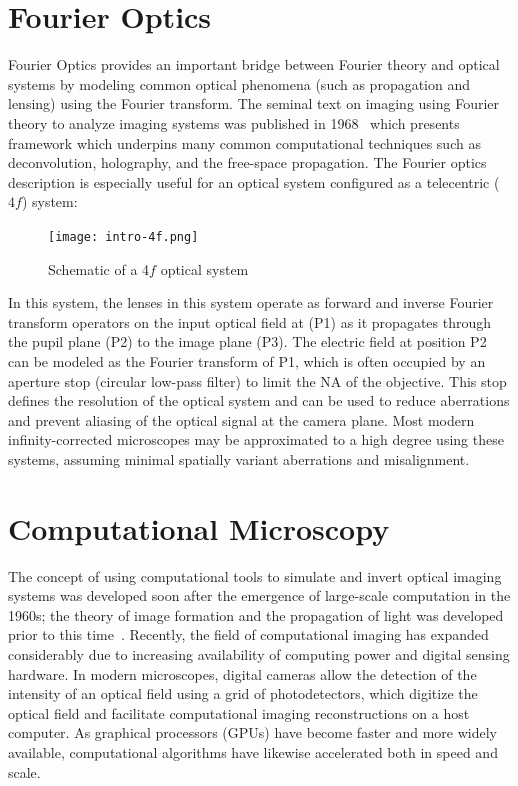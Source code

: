 \section{Fourier Optics}
Fourier Optics provides an important bridge between Fourier theory and optical systems by modeling common optical phenomena (such as propagation and lensing) using the Fourier transform. The seminal text on imaging using Fourier theory to analyze imaging systems was published in 1968~\cite{goodman:68} which presents framework which underpins many common computational techniques such as deconvolution, holography, and the free-space propagation. The Fourier optics description is especially useful for an optical system configured as a telecentric ($4f$) system:

\begin{figure}[tbh]
\centering
\texttt{[image: intro-4f.png]}
\caption{\label{fig:4f} Schematic of a 4$f$ optical system}
\end{figure}

\noindent In this system, the lenses in this system operate as forward and inverse Fourier transform operators on the input optical field at (P1) as it propagates through the pupil plane (P2) to the image plane (P3). The electric field at position P2 can be modeled as the Fourier transform of P1, which is often occupied by an aperture stop (circular low-pass filter) to limit the NA of the objective. This stop defines the resolution of the optical system and can be used to reduce aberrations and prevent aliasing of the optical signal at the camera plane. Most modern infinity-corrected microscopes may be approximated to a high degree using these systems, assuming minimal spatially variant aberrations and misalignment.

\section{Computational Microscopy}

The concept of using computational tools to simulate and invert optical imaging systems was developed soon after the emergence of large-scale computation in the 1960s; the theory of image formation and the propagation of light was developed prior to this time~\cite{maxwell1890scientific, gernheim1969history}. Recently, the field of computational imaging has expanded considerably due to increasing availability of computing power and digital sensing hardware. In modern microscopes, digital cameras allow the detection of the intensity of an optical field using a grid of photodetectors, which digitize the optical field and facilitate computational imaging reconstructions on a host computer. As graphical processors (GPUs) have become faster and more widely available, computational algorithms have likewise accelerated both in speed and scale.

